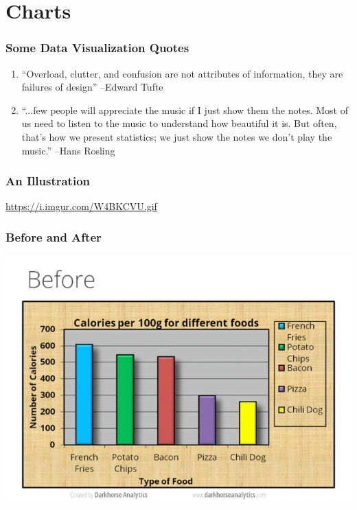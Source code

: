 \documentclass[handout]{beamer}
\begin{document}
\section{Charts}
\begin{frame}
\frametitle{Some Data Visualization Quotes}
	\begin{enumerate}
		\item ``Overload, clutter, and confusion are not attributes of information, they are failures 			of design'' --Edward Tufte
		
		\medskip
		
		\item ``...few people will appreciate the music if I just show them the notes. Most of us 				need to listen to the music to understand how beautiful it is. But often, that's how we 				present statistics; we just show the notes we don't play the music.'' --Hans Rosling
	\end{enumerate}
\end{frame}

\begin{frame}
\frametitle{An Illustration}
	\url{https://i.imgur.com/W4BKCVU.gif}	
\end{frame}

\begin{frame}
\frametitle{Before and After}
	\includegraphics[width = \textwidth]{./images/designBefore.png}
\end{frame}
\end{document}
